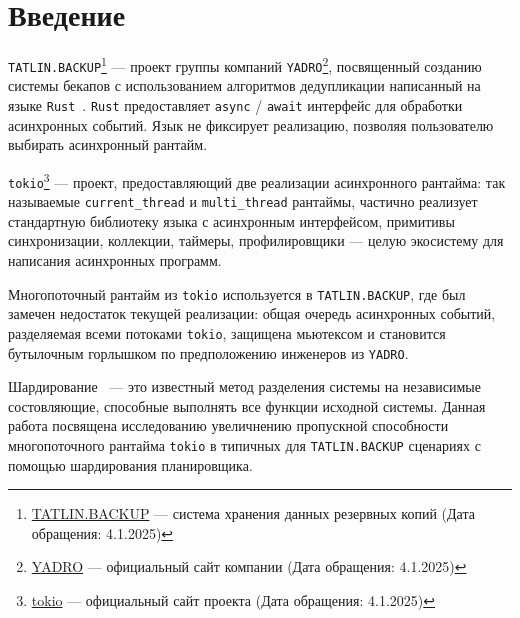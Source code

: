 
\section*{Введение}
\thispagestyle{withCompileDate}

\verb|TATLIN.BACKUP|\footnote{\href{https://yadro.com/ru/tatlin/backup}{TATLIN.BACKUP}
--- система хранения данных резервных копий (Дата обращения: 4.1.2025)} --- проект группы компаний \verb|YADRO|\footnote{\href{https://yadro.com/}{YADRO} --- официальный сайт компании (Дата обращения: 4.1.2025)}, посвященный созданию системы бекапов с использованием алгоритмов дедупликации написанный на языке \verb|Rust|~\cite{RustCommunity}. \verb|Rust| предоставляет \verb|async| / \verb|await|\cite{fsharpasyncawait} интерфейс для обработки асинхронных событий. Язык не фиксирует реализацию, позволяя пользователю выбирать асинхронный рантайм.

\verb|tokio|\footnote{\href{https://tokio.rs/}{tokio} --- официальный сайт проекта (Дата обращения: 4.1.2025)} --- проект, предоставляющий две реализации асинхронного рантайма: так называемые \verb|current_thread| и \verb|multi_thread| рантаймы, частично реализует стандартную библиотеку языка с асинхронным интерфейсом, примитивы синхронизации, коллекции, таймеры, профилировщики --- целую экосистему для написания асинхронных программ.

Многопоточный рантайм из \verb|tokio| используется в \verb|TATLIN.BACKUP|, где был замечен недостаток текущей реализации: общая очередь асинхронных событий, разделяемая всеми потоками \verb|tokio|, защищена мьютексом и становится бутылочным горлышком по предположению инженеров из \verb|YADRO|.

Шардирование~\cite{ShardingCriticalReview} --- это известный метод разделения системы на независимые состовляющие, способные выполнять все функции исходной системы. Данная работа посвящена исследованию увеличнению пропускной способности многопоточного рантайма \verb|tokio| в типичных для \verb|TATLIN.BACKUP| сценариях с помощью шардирования планировщика.
